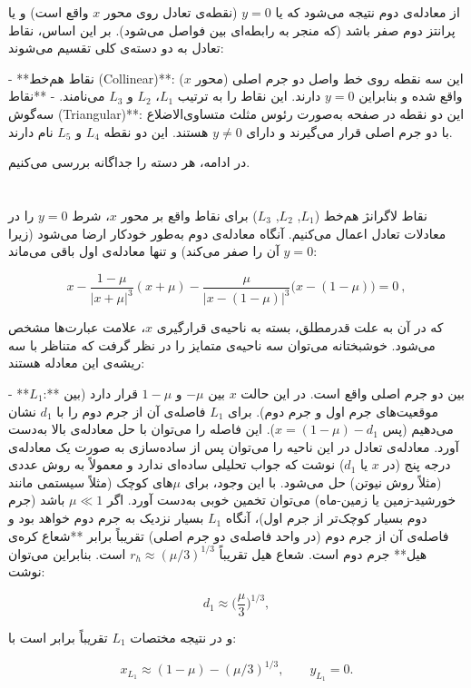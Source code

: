 از معادله‌ی دوم نتیجه می‌شود که یا $y=0$ (نقطه‌ی تعادل روی محور $x$ واقع است) و یا پرانتز دوم صفر باشد (که منجر به رابطه‌ای بین فواصل می‌شود). بر این اساس، نقاط تعادل به دو دسته‌ی کلی تقسیم می‌شوند:

- **نقاط هم‌خط (Collinear)**: این سه نقطه روی خط واصل دو جرم اصلی (محور $x$) واقع شده و بنابراین $y=0$ دارند. این نقاط را به ترتیب $L_1$، $L_2$ و $L_3$ می‌نامند.  
- **نقاط سه‌گوش (Triangular)**: این دو نقطه در صفحه به‌صورت رئوس مثلث متساوی‌الاضلاع با دو جرم اصلی قرار می‌گیرند و دارای $y\neq0$ هستند. این دو نقطه $L_4$ و $L_5$ نام دارند.  

در ادامه، هر دسته را جداگانه بررسی می‌کنیم.

\section{} نقاط لاگرانژ هم‌خط ($L_1$, $L_2$, $L_3$)  
برای نقاط واقع بر محور $x$، شرط $y=0$ را در معادلات تعادل اعمال می‌کنیم. آنگاه معادله‌ی دوم به‌طور خودکار ارضا می‌شود (زیرا $y=0$ آن را صفر می‌کند) و تنها معادله‌ی اول باقی می‌ماند:

$$ 
x - \dfrac{1-\mu}{|x+\mu|^3}(x+\mu) - \dfrac{\mu}{|x-(1-\mu)|^3}\Big(x-(1-\mu)\Big) = 0~,
$$

که در آن به علت قدرمطلق، بسته به ناحیه‌ی قرارگیری $x$، علامت عبارت‌ها مشخص می‌شود. خوشبختانه می‌توان سه ناحیه‌ی متمایز را در نظر گرفت که متناظر با سه ریشه‌ی این معادله هستند:  

- **$L_1$:** بین دو جرم اصلی واقع است. در این حالت $x$ بین $-\mu$ و $1-\mu$ قرار دارد (بین موقعیت‌های جرم اول و جرم دوم). برای $L_1$ فاصله‌ی آن از جرم دوم را با $d_1$ نشان می‌دهیم (پس $x = (1-\mu) - d_1$). این فاصله را می‌توان با حل معادله‌ی بالا به‌دست آورد. معادله‌ی تعادل در این ناحیه را می‌توان پس از ساده‌سازی به صورت یک معادله‌ی درجه پنج (در $x$ یا $d_1$) نوشت که جواب تحلیلی ساده‌ای ندارد و معمولاً به روش عددی (مثلاً روش نیوتن) حل می‌شود. با این وجود، برای $\mu$های کوچک (مثلاً سیستمی مانند خورشید-زمین یا زمین-ماه) می‌توان تخمین خوبی به‌دست آورد. اگر $\mu \ll 1$ باشد (جرم دوم بسیار کوچک‌تر از جرم اول)، آنگاه $L_1$ بسیار نزدیک به جرم دوم خواهد بود و فاصله‌ی آن از جرم دوم (در واحد فاصله‌ی دو جرم اصلی) تقریباً برابر **شعاع کره‌ی هیل** جرم دوم است. شعاع هیل تقریباً $r_h \approx (\mu/3)^{1/3}$ است. بنابراین می‌توان نوشت: 

$$d_1 \approx \Big(\dfrac{\mu}{3}\Big)^{1/3},$$ 

و در نتیجه مختصات $L_1$ تقریباً برابر است با: 

$$x_{L_1} \approx (1-\mu) - (\mu/3)^{1/3}, \qquad y_{L_1}=0.$$ 

